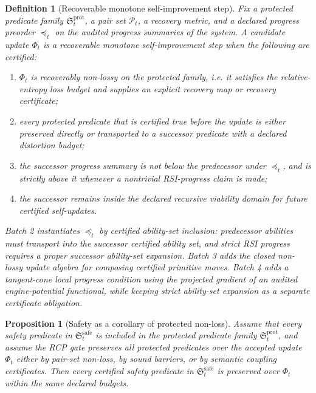 \documentclass[11pt]{article}
\newtheorem{proposition}[theorem]{Proposition}
\newtheorem{definition}[theorem]{Definition}
\newcommand{\Pcal}{\mathcal{P}}
\newcommand{\1}{\mathbf{1}}
\begin{document}
\begin{definition}[Recoverable monotone self-improvement step]
Fix a protected predicate family \(\mathfrak S_t^{\mathrm{prot}}\), a pair set \(\Pcal_t\), a recovery metric, and a declared progress preorder \(\preceq_t\) on the audited progress summaries of the system.  A candidate update \(\Phi_t\) is a recoverable monotone self-improvement step when the following are certified:
\begin{enumerate}[label=(\roman*)]
    \item \(\Phi_t\) is recoverably non-lossy on the protected family, i.e. it satisfies the relative-entropy loss budget and supplies an explicit recovery map or recovery certificate;
    \item every protected predicate that is certified true before the update is either preserved directly or transported to a successor predicate with a declared distortion budget;
    \item the successor progress summary is not below the predecessor under \(\preceq_t\), and is strictly above it whenever a nontrivial RSI-progress claim is made;
    \item the successor remains inside the declared recursive viability domain for future certified self-updates.
\end{enumerate}
Batch 2 instantiates \(\preceq_t\) by certified ability-set inclusion: predecessor abilities must transport into the successor certified ability set, and strict RSI progress requires a proper successor ability-set expansion. Batch 3 adds the closed non-lossy update algebra for composing certified primitive moves. Batch 4 adds a tangent-cone local progress condition using the projected gradient of an audited engine-potential functional, while keeping strict ability-set expansion as a separate certificate obligation.
\end{definition}

\begin{proposition}[Safety as a corollary of protected non-loss]
\label{prop:safety_as_corollary_of_nonloss}
Assume that every safety predicate in \(\mathfrak S_t^{\mathrm{safe}}\) is included in the protected predicate family \(\mathfrak S_t^{\mathrm{prot}}\), and assume the RCP gate preserves all protected predicates over the accepted update \(\Phi_t\) either by pair-set non-loss, by sound barriers, or by semantic coupling certificates.  Then every certified safety predicate in \(\mathfrak S_t^{\mathrm{safe}}\) is preserved over \(\Phi_t\) within the same declared budgets.
\end{proposition}
\end{document}
